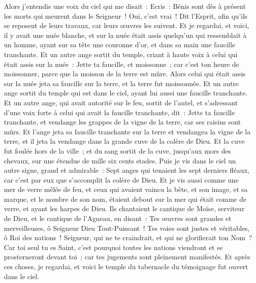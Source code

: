 \begin{multicols}{2}
Alors j'entendis une voix du ciel qui me disait~: Ecris~: Bénis sont dès à présent les morts qui meurent dans le Seigneur~! Oui, c'est vrai~! Dit l'Esprit, afin qu'ils se reposent de leurs travaux, car leurs œuvres les suivent.
Et je regardai, et voici, il y avait une nuée blanche, et sur la nuée était assis quelqu'un qui ressemblait à un homme, ayant sur sa tête une couronne d'or, et dans sa main une faucille tranchante.
Et un autre ange sortit du temple, criant à haute voix à celui qui était assis sur la nuée~: Jette ta faucille, et moissonne~; car c'est ton heure de moissonner, parce que la moisson de la terre est mûre.
Alors celui qui était assis sur la nuée jeta sa faucille sur la terre, et la terre fut moissonnée.
Et un autre ange sortit du temple qui est dans le ciel, ayant lui aussi une faucille tranchante.
Et un autre ange, qui avait autorité sur le feu, sortit de l'autel, et s'adressant d'une voix forte à celui qui avait la faucille tranchante, dit~: Jette ta faucille tranchante, et vendange les grappes de la vigne de la terre, car ses raisins sont mûrs.
Et l'ange jeta sa faucille tranchante sur la terre et vendangea la vigne de la terre, et il jeta la vendange dans la grande cuve de la colère de Dieu.
Et la cuve fut foulée hors de la ville~; et du sang sortit de la cuve, jusqu'aux mors des chevaux, sur une étendue de mille six cents stades.
\VerseOne{}Puis je vis dans le ciel un autre signe, grand et admirable~: Sept anges qui tenaient les sept derniers fléaux, car c'est par eux que s'accomplit la colère de Dieu.
Et je vis aussi comme une mer de verre mêlée de feu, et ceux qui avaient vaincu la bête, et son image, et sa marque, et le nombre de son nom, étaient debout sur la mer qui était comme de verre, et ayant les harpes de Dieu.
Ils chantaient le cantique de Moïse, serviteur de Dieu, et le cantique de l'Agneau, en disant~: Tes œuvres sont grandes et merveilleuses, ô Seigneur Dieu Tout-Puissant~! Tes voies sont justes et véritables, ô Roi des nations~!
Seigneur, qui ne te craindrait, et qui ne glorifierait ton Nom~? Car toi seul tu es Saint, c'est pourquoi toutes les nations viendront et se prosterneront devant toi~; car tes jugements sont pleinement manifestés.
Et après ces choses, je regardai, et voici le temple du tabernacle du témoignage fut ouvert dans le ciel.

\end{multicols}
